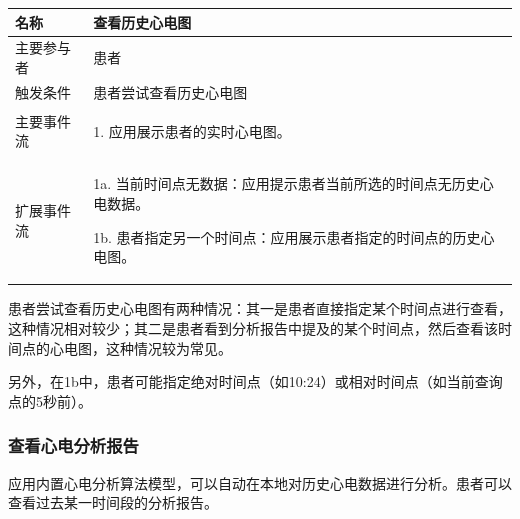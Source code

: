 \begin{table}[!ht]
    \label{tab:uc-history-ecg}
    \begin{tabularx}{\textwidth}{|l|X|}
        \hline
        名称    & 查看历史心电图     \\
        \hline
        主要参与者 & 患者          \\
        \hline
        触发条件  & 患者尝试查看历史心电图 \\
        \hline
        主要事件流 &
        \begin{itemizec}
            \item[1.] 应用展示患者的实时心电图。
        \end{itemizec} \\
        \hline
        扩展事件流 &
        \begin{itemizec}
            \item[1a.] 当前时间点无数据：应用提示患者当前所选的时间点无历史心电数据。
            \item[1b.] 患者指定另一个时间点：应用展示患者指定的时间点的历史心电图。
        \end{itemizec} \\
        \hline
    \end{tabularx}
\end{table}

患者尝试查看历史心电图有两种情况：其一是患者直接指定某个时间点进行查看，这种情况相对较少；其二是患者看到分析报告中提及的某个时间点，然后查看该时间点的心电图，这种情况较为常见。

另外，在1b中，患者可能指定绝对时间点（如10:24）或相对时间点（如当前查询点的5秒前）。

\subsubsection{查看心电分析报告}

应用内置心电分析算法模型，可以自动在本地对历史心电数据进行分析。患者可以查看过去某一时间段的分析报告。

